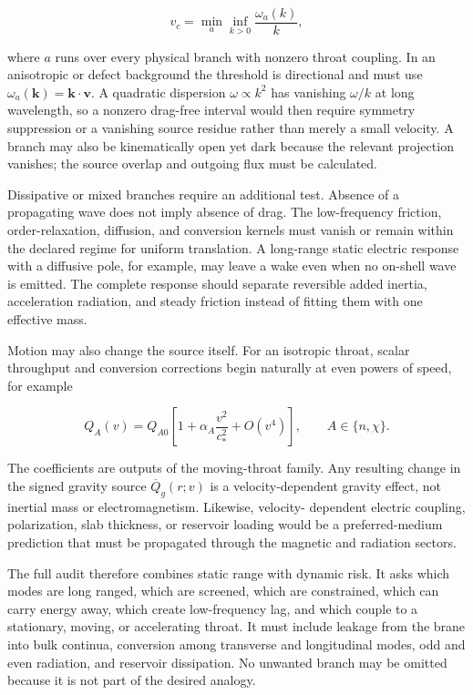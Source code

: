 \[
v_c
=
\min_a\inf_{k>0}
\frac{\omega_a(k)}{k},
\]

where \(a\) runs over every physical branch with nonzero throat coupling. In an
anisotropic or defect background the threshold is directional and must use
\(\omega_a(\mathbf k)=\mathbf k\!\cdot\!\mathbf v\). A quadratic dispersion
\(\omega\propto k^2\) has vanishing \(\omega/k\) at long wavelength, so a
nonzero drag-free interval would then require symmetry suppression or a
vanishing source residue rather than merely a small velocity. A branch may also
be kinematically open yet dark because the relevant projection vanishes; the
source overlap and outgoing flux must be calculated.

Dissipative or mixed branches require an additional test. Absence of a
propagating wave does not imply absence of drag. The low-frequency friction,
order-relaxation, diffusion, and conversion kernels must vanish or remain within
the declared regime for uniform translation. A long-range static electric
response with a diffusive pole, for example, may leave a wake even when no
on-shell wave is emitted. The complete response should separate reversible
added inertia, acceleration radiation, and steady friction instead of fitting
them with one effective mass.

Motion may also change the source itself. For an isotropic throat, scalar
throughput and conversion corrections begin naturally at even powers of speed,
for example

\[
Q_A(v)
=
Q_{A0}
\left[
1+\alpha_A\frac{v^2}{c_*^2}+O(v^4)
\right],
\qquad
A\in\{n,\chi\}.
\]

The coefficients are outputs of the moving-throat family. Any resulting change
in the signed gravity source \(\overline Q_g(r;v)\) is a velocity-dependent
gravity effect, not inertial mass or electromagnetism. Likewise, velocity-
dependent electric coupling, polarization, slab thickness, or reservoir loading
would be a preferred-medium prediction that must be propagated through the
magnetic and radiation sectors.

The full audit therefore combines static range with dynamic risk. It asks which
modes are long ranged, which are screened, which are constrained, which can
carry energy away, which create low-frequency lag, and which couple to a
stationary, moving, or accelerating throat. It must include leakage from the
brane into bulk continua, conversion among transverse and longitudinal modes,
odd and even radiation, and reservoir dissipation. No unwanted branch may be
omitted because it is not part of the desired analogy.

